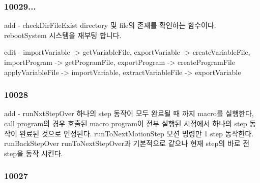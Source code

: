 \subsubsection*{10029... }

\begin{DoxyVerb}     add  - checkDirFileExist directory 및 file의 존재를 확인하는 함수이다.
            rebootSystem 시스템을 재부팅 합니다.

     edit - importVariable -> getVariableFile, exportVariable -> createVariableFile,
            importProgram -> getProgramFile, exportProgram -> createProgramFile
            applyVariableFile -> importVariable, extractVariableFile -> exportVariable
\end{DoxyVerb}


\subsubsection*{10028 }

\begin{DoxyVerb}     add  - runNxtStepOver 하나의 step 동작이 모두 완료될 때 까지 macro를 실행한다, call program의 경우
            호출된 macro program이 전부 실행된 시점에서 하나의 step 동작이 완료된 것으로 인정된다.
            runToNextMotionStep 모션 명령만 1 step 동작한다.
            runBackStepOver runToNextStepOver과 기본적으로 같으나 현재 step의 바로 전 step을 동작 시킨다.
\end{DoxyVerb}


\subsubsection*{10027 }

